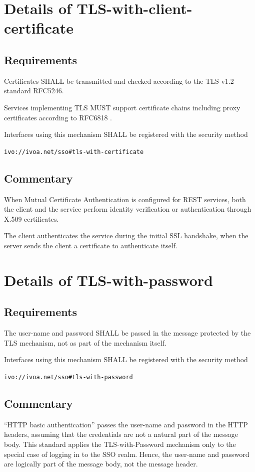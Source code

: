 \documentclass[11pt,a4paper]{ivoa}
\begin{document}
\section{Details of TLS-with-client-certificate}
\subsection{Requirements}
Certificates SHALL be transmitted and checked according to the TLS v1.2 standard RFC5246.

Services implementing TLS MUST support certificate chains including proxy certificates according to RFC6818  \citep{std:RFC6818}.

Interfaces using this mechanism SHALL be  registered with the security method 

\texttt{ivo://ivoa.net/sso\#tls-with-certificate}

\subsection{Commentary}
When Mutual Certificate Authentication is configured for REST services, both the client and the service perform 
identity verification or authentication through X.509 certificates. 

The client authenticates the service during the initial SSL handshake, when the server sends the client a certificate to authenticate itself.

\section{Details of TLS-with-password}
\subsection{Requirements}
The user-name and password SHALL be passed in the message protected by the TLS mechanism, 
not as part of the mechanism itself. 

Interfaces using this mechanism SHALL  be registered with the security method 

\texttt{ivo://ivoa.net/sso\#tls-with-password}

\subsection{Commentary}
``HTTP basic authentication'' passes the user-name and password in the HTTP headers, 
assuming that the credentials are not a natural part of the message body. 
This standard applies the TLS-with-Password mechanism only to the special case of logging in to the SSO realm. 
Hence, the user-name and password are logically part of the message body, not the message header.
\end{document}
